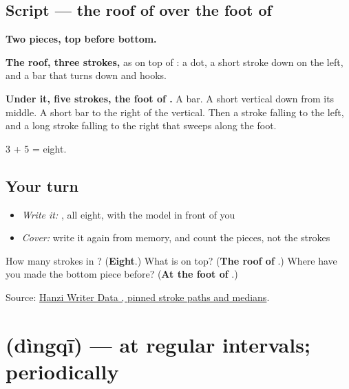 \subsection*{Script — the roof of  over the foot of }

\begin{quote}
\end{quote}

\textbf{Two pieces, top before bottom.}

\textbf{The roof, three strokes,} as on top of : a dot, a short stroke down on the left, and a bar that turns down and hooks.

\textbf{Under it, five strokes, the foot of .} A bar. A short vertical down from its middle. A short bar to the right of the vertical. Then a stroke falling to the left, and a long stroke falling to the right that sweeps along the foot.

3 + 5 = eight.

\subsection*{Your turn}
\begin{itemize}
\raggedright
  \item \emph{Write it:} , all eight, with the model in front of you
  \item \emph{Cover:} write it again from memory, and count the pieces, not the strokes
\end{itemize}

\begin{tcolorbox}[breakable,colback=teal!4,colframe=teal!35!black,title={Before you move on}]
How many strokes in ? (\textbf{Eight}.) What is on top? (\textbf{The roof of }.) Where have you made the bottom piece before? (\textbf{At the foot of }.)

Source: \href{https://raw.githubusercontent.com/chanind/hanzi-writer-data/68d10a4b21150cae5e1ebbd223eed289cf32d90c/data/\%E5\%AE\%9A.json}{Hanzi Writer Data , pinned stroke paths and medians}.
\end{tcolorbox}
\section[\texorpdfstring{\zh{定期} (dìngqī)}{定期 (dìngqī)}]{ (dìngqī) — at regular intervals; periodically}

